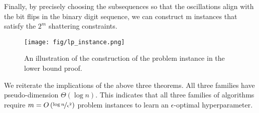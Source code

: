 Finally, by precisely choosing the subsequences so that the oscillations align with the bit flips in the binary digit sequence, we can construct m instances that satisfy the $2^m$ shattering constraints.
\begin{figure}[ht]
    \centering
    \texttt{[image: fig/lp\_instance.png]}
    \caption{An illustration of the construction of the problem instance in the lower bound proof. 
    }
    \label{fig:instance_graph}
\end{figure}
%
\begin{remark}
    We reiterate the implications of the above three theorems. All three families have pseudo-dimension $\Theta(\log n)$. This indicates that all three families of algorithms require $m = O\left(\nicefrac{\log n}{\epsilon^2}\right)$ problem instances to learn an $\epsilon$-optimal hyperparameter. 
\end{remark}